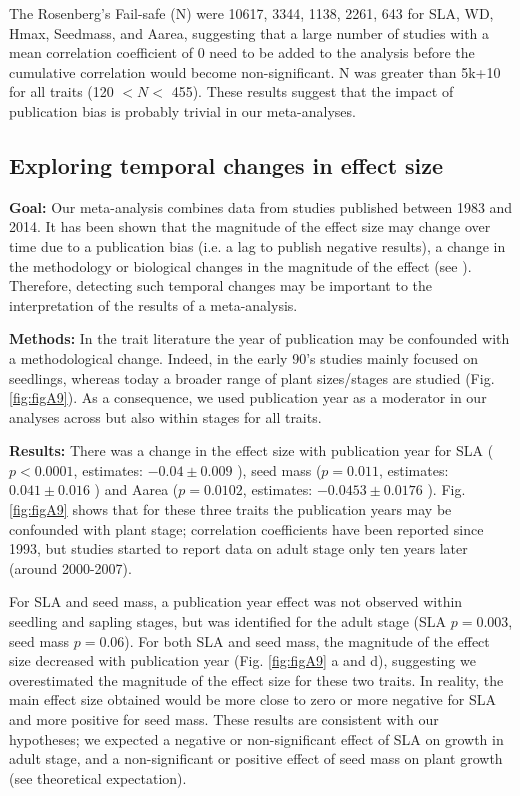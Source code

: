 The Rosenberg's Fail-safe (N) were 10617, 3344, 1138, 2261, 643 for SLA, WD, Hmax, Seedmass, and Aarea, suggesting that a large number of studies with a mean correlation coefficient of 0 need to be added to the analysis before the cumulative correlation would become non-significant. N was greater than 5k+10 for all traits (120 $< N <$ 455).
These results suggest that the impact of publication bias is probably trivial in our meta-analyses.

\clearpage
\subsection{Exploring temporal changes in effect size}
\noindent\textbf{Goal:} Our meta-analysis combines data from studies published between 1983 and 2014. It has been shown that the magnitude of the effect size may change over time due to a publication bias (i.e. a lag to publish negative results), a change in the methodology or biological changes in the magnitude of the effect (see \citealt{Koricheva:2013hy}). Therefore, detecting such temporal changes may be important to the interpretation of the results of a meta-analysis.

\noindent\textbf{Methods:} In the trait literature the year of publication may be confounded with a methodological change. Indeed, in the early 90's studies mainly focused on seedlings, whereas today a broader range of plant sizes/stages are studied (Fig. \ref{fig:figA9}). As a consequence, we used publication year as a moderator in our analyses \citep{Zvereva:2008jm} across but also within stages for all traits.

\noindent\textbf{Results:} There was a change in the effect size with publication year for SLA ($p<0.0001$, estimates: $-0.04 \pm 0.009$ ), seed mass ($p = 0.011$, estimates: $0.041 \pm 0.016$ ) and Aarea ($p = 0.0102$, estimates: $-0.0453 \pm 0.0176$ ). Fig. \ref{fig:figA9} shows that for these three traits the publication years may be confounded with plant stage; correlation coefficients have been reported since 1993, but studies started to report data on adult stage only ten years later (around 2000-2007).

For SLA and seed mass, a publication year effect was not observed within seedling and sapling stages, but was identified for the adult stage (SLA $p = 0.003$, seed mass $p = 0.06$). For both SLA and seed mass, the magnitude of the effect size decreased with publication year (Fig. \ref{fig:figA9} a and d), suggesting we overestimated the magnitude of the effect size for these two traits. In reality, the main effect size obtained would be more close to zero or more negative for SLA and more positive for seed mass. These results are consistent with our hypotheses; we expected a negative or non-significant effect of SLA on growth in adult stage, and a non-significant or positive effect of seed mass on plant growth (see theoretical expectation).


